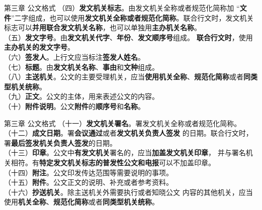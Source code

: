 \documentclass[aspectratio=169]{beamer}
\begin{document}
    \begin{frame}[t]{第三章 公文格式} \vspace{20pt}
        （四）\textbf{发文机关标志}。由发文机关全称或者规范化简称加
        “\textbf{文件}”二字组成，也可以使用\textbf{发文机关全称或者规范化简称}。联合行文时，发文机关标志可以\textbf{并用联合发文机关名称}，也可以单独用\textbf{主办机关名称}。\\
        （五）\textbf{发文字号}。由\textbf{发文机关代字}、\textbf{年份}、\textbf{发文顺序号}组成。
        \textbf{联合行文时}，使用\textbf{主办机关的发文字号}。\\
        （六）\textbf{签发人}。上行文应当标注\textbf{签发人姓名}。\\
        （七）\textbf{标题}。由\textbf{发文机关名称}、\textbf{事由}和\textbf{文种}组成。\\
        （八）\textbf{主送机关}。公文的主要受理机关，应当\textbf{使用机关全称}、\textbf{规范化简称}或者\textbf{同类型机关统称}。\\
        （九）\textbf{正文}。公文的主体，用来表述公文的内容。\\
        （十）\textbf{附件说明}。公文\textbf{附件}的\textbf{顺序号}和\textbf{名称}。\\
    \end{frame}




    \begin{frame}[t]{第三章 公文格式} \vspace{20pt}
        （十一）\textbf{发文机关署名}。署发文机关全称或者规范化简称。\\
        （十二）\textbf{成文日期}。署\textbf{会议通过}或者\textbf{发文机关负责人签发}
        的日期。联合行文时，署\textbf{最后签发机关负责人签发}的日期。\\
        （十三）\textbf{印章}。公文中\textbf{有发文机关}署名的，应当\textbf{加盖发文机关印章}，
        并与署名机关相符。有\textbf{特定发文机关标志的普发性公文和电报}可以不加盖印章。\\
        （十四）\textbf{附注}。公文印发传达范围等需要说明的事项。\\
        （十五）\textbf{附件}。公文正文的说明、补充或者参考资料。\\
        （十六）\textbf{抄送机关}。除主送机关外需要执行或者知晓公文
        内容的其他机关，应当使用\textbf{机关全称}、\textbf{规范化简称}或者\textbf{同类型机关统称}。\\

    \end{frame}
\end{document}
